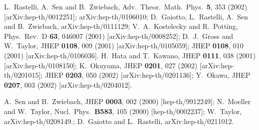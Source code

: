 \documentclass[a4paper,11pt]{article}
\begin{document}
\begin{thebibliography}{99}
 {\small %
}

{\small %
L.~Rastelli, A.~Sen and B.~Zwiebach,
Adv.\ Theor.\ Math.\ Phys.\ \textbf{5}, 353 (2002) [arXiv:hep-th/0012251];
arXiv:hep-th/0106010; \newline
%
%
D.~Gaiotto, L.~Rastelli, A.~Sen and B.~Zwiebach,
arXiv:hep-th/0111129;\newline
%
V.~A.~Kostelecky and R.~Potting,
Phys.\ Rev.\ D \textbf{63}, 046007 (2001) [arXiv:hep-th/0008252];\newline
%
D.~J.~Gross and W.~Taylor, %
JHEP \textbf{0108}, 009 (2001) [arXiv:hep-th/0105059];
%
%
JHEP \textbf{0108}, 010 (2001) [arXiv:hep-th/0106036].\newline
%
%
H.~Hata and T.~Kawano,
JHEP \textbf{0111}, 038 (2001) [arXiv:hep-th/0108150];\newline
K.~Okuyama, %
JHEP \textbf{0201}, 027 (2002) [arXiv:hep-th/0201015]; %
JHEP \textbf{0203}, 050 (2002) [arXiv:hep-th/0201136];\newline
%
Y.~Okawa,
JHEP \textbf{0207}, 003 (2002) [arXiv:hep-th/0204012].
}

 {\small %
A.\ Sen and B.\ Zwiebach, %
JHEP \textbf{0003}, 002 (2000) [hep-th/9912249];\newline
%
N.\ Moeller and W.\ Taylor,
Nucl.\ Phys.\ \textbf{B583}, 105 (2000) [hep-th/0002237];\newline
W.~Taylor, %
arXiv:hep-th/0208149.;\newline
%
%
D.~Gaiotto and L.~Rastelli, %
arXiv:hep-th/0211012. %
}


\end{thebibliography}
\end{document}
